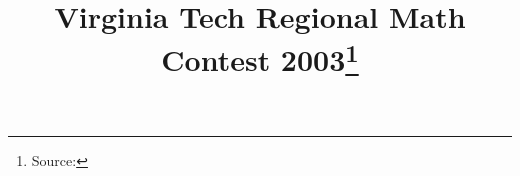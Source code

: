 \documentclass[10pt]{article}
\begin{document}
\title{Virginia Tech Regional Math Contest 2003\footnote{Source: \source}}
\author{\vspace{-2ex}}
\date{\vspace{-6ex}} %
\maketitle







\end{document}
